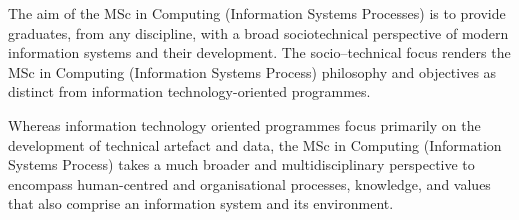

\begin{programmeAim}{The aim of the MSc in Computing (Information Systems Processes) is}   to provide graduates, from any discipline, with a broad sociotechnical perspective of modern information systems and their development. The socio--technical focus renders the MSc in Computing (Information Systems Process) philosophy and objectives as distinct from information technology-oriented programmes. 
	
	Whereas information technology oriented programmes focus primarily on the development of technical artefact and data, the MSc in Computing (Information Systems Process) takes a much broader and multidisciplinary perspective to encompass human-centred and organisational processes, knowledge, and values that also comprise an information system and its environment.

\end{programmeAim}

\vfill\mbox{}\clearpage

\vfill



